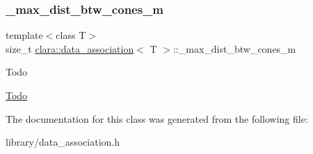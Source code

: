 \subsubsection{\texorpdfstring{\+\_\+max\+\_\+dist\+\_\+btw\+\_\+cones\+\_\+m}{\_max\_dist\_btw\_cones\_m}}
{\footnotesize\ttfamily template$<$class T$>$ \\
size\+\_\+t \hyperlink{classclara_1_1data__association}{clara\+::data\+\_\+association}$<$ T $>$\+::\+\_\+max\+\_\+dist\+\_\+btw\+\_\+cones\+\_\+m}

\begin{DoxyRefDesc}{Todo}
\item[\hyperlink{todo__todo000012}{Todo}]\end{DoxyRefDesc}


The documentation for this class was generated from the following file\+:\begin{DoxyCompactItemize}
\item 
library/data\+\_\+association.\+h\end{DoxyCompactItemize}
